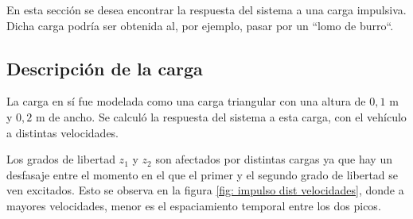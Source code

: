 \documentclass[oneside, a4paper, spanish, links]{amca}
\begin{document}
En esta sección se desea encontrar la respuesta del sistema a una carga impulsiva. Dicha carga podría ser obtenida al, por ejemplo, pasar por un ``lomo de burro``.

\subsection{Descripción de la carga}
La carga en sí fue modelada como una carga triangular con una altura de $0,1$ m y $0,2$ m de ancho. Se calculó la respuesta del sistema a esta carga, con el vehículo a distintas velocidades. 

Los grados de libertad \textit{$z_1$} y \textit{$z_2$} son afectados por distintas cargas ya que hay un desfasaje entre el momento en el que el primer y el segundo grado de libertad se ven excitados. Esto se observa en la figura \ref{fig: impulso dist velocidades}, donde a mayores velocidades, menor es el espaciamiento temporal entre los dos picos.
\end{document}
